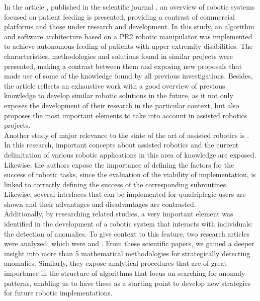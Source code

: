\documentclass[11pt]{report} %
\begin{document}
In the article  \citep{cite_park_active_robot_assisted_feeding}, published in the scientific journal , an overview of robotic systems focused on patient feeding is presented, providing a contrast of commercial platforms and those under research and development. In this study, an algorithm and software architecture based on a PR2 robotic manipulator was implemented to achieve autonomous feeding of patients with upper extremity disabilities. The characteristics, methodologies and solutions found in similar projects were presented, making a contrast between them and exposing new proposals that made use of some of the knowledge found by all previous investigations. Besides, the article reflects an exhaustive work with a good overview of previous knowledge to develop similar robotic solutions in the future, as it not only exposes the development of their research in the particular context, but also proposes the most important elements to take into account in assisted robotics projects.\\

Another study of major relevance to the state of the art of assisted robotics is  \citep{cite_SAM_an_assisted_robotic_device_to_help_quadriplegia_persons}. In this research, important concepts about assisted robotics and the current delimitation of various robotic applications in this area of knowledge are exposed. Likewise, the authors expose the importance of defining the factors for the success of robotic tasks, since the evaluation of the viability of implementation, is linked to correctly defining the success of the corresponding subroutines. Likewise, several interfaces that can be implemented for quadriplegic users are shown and their advantages and disadvantages are contrasted.\\

Additionally, by researching related studies, a very important element was identified in the development of a robotic system that interacts with individuals: the detection of anomalies. To give context to this feature, two research articles were analyzed, which were  \citep{cite_multimodal_execution_monitor_with_anomaly_classification} and  \citep{cite_multimodal_anomaly_detector_for_robot_assisted_feeding_LSTM}. From these scientific papers, we gained a deeper insight into more than 5 mathematical methodologies for strategically detecting anomalies. Similarly, they expose analytical procedures that are of great importance in the structure of algorithms that focus on searching for anomaly patterns, enabling us to have these as a starting point to develop new strategies for future robotic implementations.\\
\end{document}
